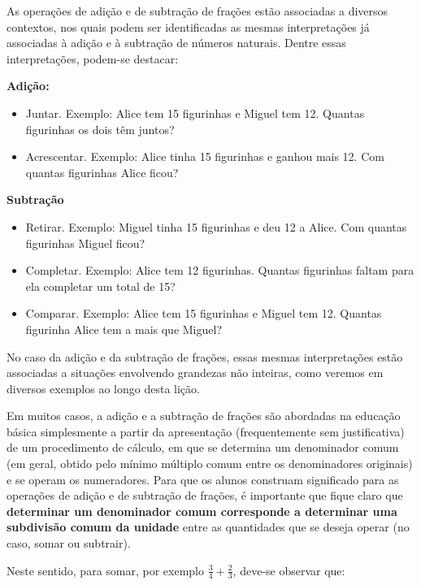 
\noindent {\color{special}{\Large \bf LIÇÃO 5 - Para o professor}}
\vspace{.5cm}

  As operações de adição e de subtração de frações estão associadas a diversos contextos, nos quais podem ser identificadas as mesmas interpretações já associadas à adição e à subtração de números naturais.
  Dentre essas interpretações, podem-se destacar:

{\bf Adição:}
\begin{itemize} %
    \item       Juntar. Exemplo: Alice tem 15 figurinhas e Miguel tem 12. Quantas figurinhas os dois têm juntos?
    \item       Acrescentar. Exemplo: Alice tinha 15 figurinhas e ganhou mais 12. Com quantas figurinhas Alice ficou?
\end{itemize} %


{\bf Subtração}
\begin{itemize} %
    \item       Retirar. Exemplo: Miguel tinha 15 figurinhas e deu 12 a Alice. Com quantas figurinhas Miguel ficou?
    \item       Completar. Exemplo: Alice tem 12 figurinhas. Quantas figurinhas faltam para ela completar um total de 15?
    \item       Comparar. Exemplo: Alice tem 15 figurinhas e Miguel tem 12. Quantas figurinha Alice tem a mais que Miguel?
\end{itemize} %


  No caso da adição e da subtração de frações, essas mesmas interpretações estão associadas a situações envolvendo grandezas não inteiras, como veremos em diversos exemplos ao longo desta lição.

  Em muitos casos, a adição e a subtração de frações são abordadas na educação básica simplesmente a partir da apresentação (frequentemente sem justificativa) de um procedimento de cálculo, em que se determina um denominador comum (em geral, obtido pelo mínimo múltiplo comum entre os denominadores originais) e se operam os numeradores. Para que os alunos construam significado para as operações de adição e de subtração de frações, é importante que fique claro que   {\bf determinar um denominador comum corresponde a determinar uma subdivisão comum da unidade}   entre as quantidades que se deseja operar (no caso, somar ou subtrair).

  Neste sentido, para somar, por exemplo   $\frac{3}{4} + \frac{2}{3}$, deve-se observar que:

